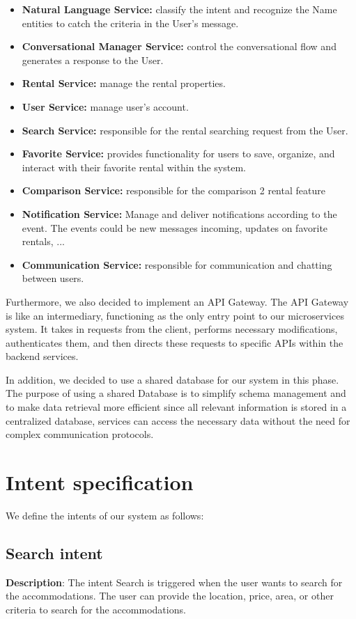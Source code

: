 \begin{itemize}
    \item \textbf{Natural Language Service:} classify the intent and recognize the Name entities to catch the criteria in the User's message.
    \item \textbf{Conversational Manager Service:} control the conversational flow and generates a response to the User.
    \item \textbf{Rental Service:} manage the rental properties.
    \item \textbf{User Service:} manage user's account.
    \item \textbf{Search Service:} responsible for the rental searching request from the User.
    \item \textbf{Favorite Service:} provides functionality for users to save, organize, and interact with their favorite rental within the system.
    \item \textbf{Comparison Service:} responsible for the comparison 2 rental feature 
    \item \textbf{Notification Service:} Manage and deliver notifications according to the event. The events could be new messages incoming, updates on favorite rentals, ...
    \item \textbf{Communication Service:} responsible for communication and chatting between users.
\end{itemize}

Furthermore, we also decided to implement an API Gateway. The API Gateway is like an intermediary, functioning as the only entry point to our microservices system. It takes in requests from the client, performs necessary modifications, authenticates them, and then directs these requests to specific APIs within the backend services.

In addition, we decided to use a shared database for our system in this phase. The purpose of using a shared Database is to simplify schema management and to make data retrieval more efficient since all relevant information is stored in a centralized database, services can access the necessary data without the need for complex communication protocols.

\section{Intent specification}
We define the intents of our system as follows:

\subsection{Search intent}
\textbf{Description}: The intent Search is triggered when the user wants to search for the accommodations. The user can provide the location, price, area, or other criteria to search for the accommodations. 

